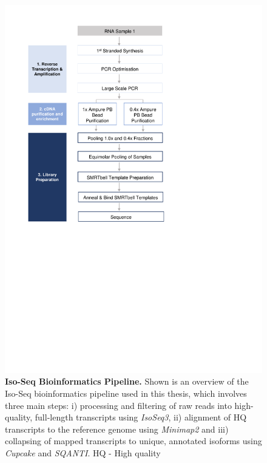 \begin{figure}[]
	\centering
	\vspace{20pt}
	\includegraphics[page=17,trim={0 6cm 0 0},clip,scale = 0.8]{Figures/ProjectDevelopment_Figures.pdf}
	\captionsetup{width=0.95\textwidth}
	\caption[Iso-Seq Bioinformatics Pipeline]%
	{\textbf{Iso-Seq Bioinformatics Pipeline.} Shown is an overview of the Iso-Seq bioinformatics pipeline used in this thesis, which involves three main steps: i) processing and filtering of raw reads into high-quality, full-length transcripts using \textit{IsoSeq3}, ii) alignment of HQ transcripts to the reference genome using \textit{Minimap2} and iii) collapsing of mapped transcripts to unique, annotated isoforms using \textit{Cupcake} and \textit{SQANTI}. HQ - High quality}
	\label{fig:isoseq_bioinformatics_Pipeline}
\end{figure}

